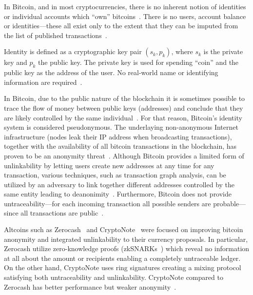 In Bitcoin, and in most cryptocurrencies, there is no inherent notion of identities or individual accounts which ``own'' bitcoins~\cite{7163021,nakamoto2012bitcoin}. There is no users, account balance or identities—these all exist only to the extent that they can be imputed from the list of published transactions~\cite{7163021,nakamoto2012bitcoin}.

Identity is defined as a cryptographic key pair $(s_k, p_k)$, where $s_k$ is the private key and $p_k$ the public key. The private key is used for spending ``coin'' and the public key as the address of the user. No real-world name or identifying information are required~\cite{7163021,nakamoto2012bitcoin}.

In Bitcoin, due to the public nature of the blockchain it is sometimes possible to trace the flow of money between public keys (addresses) and conclude that they are likely controlled by the same
individual~\cite{7163021,10.1007/978-3-319-17016-9_1}. For that reason, Bitcoin's identity system is considered pseudonymous. The underlaying non-anonymous Internet infrastructure (nodes leak their IP address when broadcasting transactions),
together with the availability of all bitcoin transactions in the blockchain, has proven to be an anonymity threat~\cite{10.1007/978-3-319-17016-9_1, 7163021,Meiklejohn:2013:FBC:2504730.2504747,6113303,10.1007/978-3-642-39884-1_2,fi5020237}.
Although Bitcoin provides a limited form of unlinkability by letting users create new addresses at any time for any transaction, various techniques, such as transaction graph analysis, can be utilized by an adversary to link together different addresses controlled
by the same entity leading to deanonimity~\cite{7163021,Meiklejohn:2013:FBC:2504730.2504747,6113303,10.1007/978-3-642-39884-1_2,fi5020237}. Furthermore, Bitcoin does not provide untraceability---for each incoming transaction all possible senders are probable---since all transactions are public~\cite{cryptonote}.

Altcoins such as Zerocash~\cite{zcash} and CryptoNote~\cite{cryptonote} were focused on improving bitcoin anonymity and integrated unlinkability to their currency proposals.
In particular, Zerocash utilize zero-knowledge proofs (zkSNARKs~\cite{10.1007/978-3-642-40084-1_6}) which reveal no information at all about the amount or recipients enabling a completely untraceable ledger. On the other hand, CryptoNote uses ring signatures creating a mixing protocol satisfying both untraceability and unlinkability. CryptoNote compared to Zerocash has better performance but weaker anonymity~\cite{7163021}.

